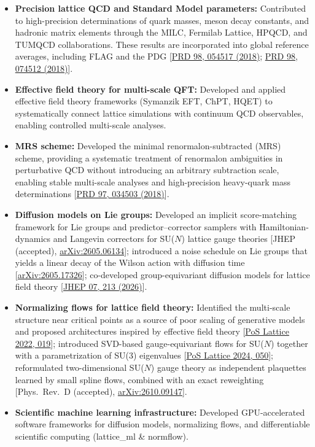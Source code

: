 \documentclass[12pt,a4paper,sans]{moderncv}
\begin{document}
\begin{itemize}

\item \textbf{Precision lattice QCD and Standard Model parameters:}
Contributed to high-precision determinations of quark masses, meson decay constants, and hadronic matrix elements through the MILC, Fermilab Lattice, HPQCD, and TUMQCD collaborations. These results are incorporated into global reference averages, including FLAG and the PDG
[\href{https://doi.org/10.1103/PhysRevD.98.054517}{PRD 98, 054517 (2018)};
\href{https://doi.org/10.1103/PhysRevD.98.074512}{PRD 98, 074512 (2018)}].

\item \textbf{Effective field theory for multi-scale QFT:}
Developed and applied effective field theory frameworks (Symanzik EFT, ChPT, HQET) to systematically connect lattice simulations with continuum QCD observables, enabling controlled multi-scale analyses.

\item \textbf{MRS scheme:}
Developed the minimal renormalon-subtracted (MRS) scheme, providing a systematic treatment of renormalon ambiguities in perturbative QCD without introducing an arbitrary subtraction scale, enabling stable multi-scale analyses and high-precision heavy-quark mass determinations
[\href{https://doi.org/10.1103/PhysRevD.97.034503}{PRD 97, 034503 (2018)}].

\item \textbf{Diffusion models on Lie groups:}
Developed an implicit score-matching framework for Lie groups and predictor--corrector samplers with Hamiltonian-dynamics and Langevin correctors for SU($N$) lattice gauge theories
[JHEP (accepted), \href{https://arxiv.org/abs/2605.06134}{arXiv:2605.06134}];
introduced a noise schedule on Lie groups that yields a linear decay of the Wilson action with diffusion time
[\href{https://arxiv.org/abs/2605.17326}{arXiv:2605.17326}];
co-developed group-equivariant diffusion models for lattice field theory
[\href{https://doi.org/10.1007/JHEP07(2026)213}{JHEP 07, 213 (2026)}].

\item \textbf{Normalizing flows for lattice field theory:}
Identified the multi-scale structure near critical points as a source of poor scaling of generative models and proposed architectures inspired by effective field theory
[\href{https://doi.org/10.22323/1.430.0019}{PoS Lattice 2022, 019}];
introduced SVD-based gauge-equivariant flows for SU($N$) together with a parametrization of SU(3) eigenvalues
[\href{https://doi.org/10.22323/1.466.0050}{PoS Lattice 2024, 050}];
reformulated two-dimensional SU($N$) gauge theory as independent plaquettes learned by small spline flows, combined with an exact reweighting
[Phys.~Rev.~D (accepted), \href{https://arxiv.org/abs/2610.09147}{arXiv:2610.09147}].

\item \textbf{Scientific machine learning infrastructure:}
Developed GPU-accelerated software frameworks for diffusion models, normalizing flows, and differentiable scientific computing (lattice\_ml \& normflow).

\end{itemize}
\end{document}
